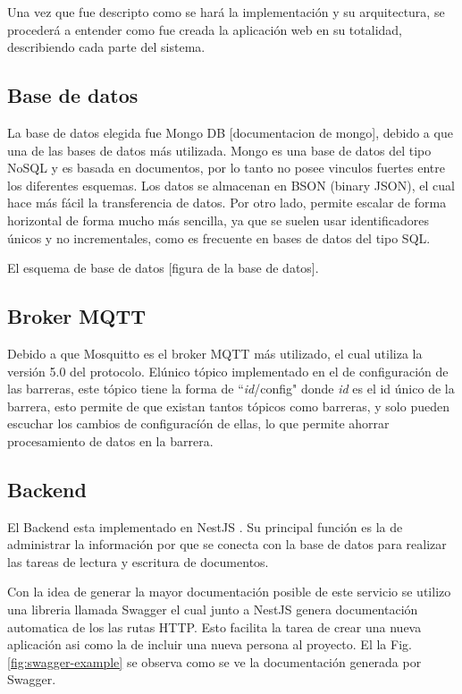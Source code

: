 Una vez que fue descripto como se hará la implementación y su arquitectura, se procederá a entender como fue creada la aplicación web en su totalidad, describiendo cada parte del sistema.

\subsection{Base de datos}

La base de datos elegida fue Mongo DB [documentacion de mongo], debido a que una de las bases de datos más utilizada. Mongo es una base de datos del tipo NoSQL y es basada en documentos, por lo tanto no posee vinculos fuertes entre los diferentes esquemas.
Los datos se almacenan en BSON (binary JSON), el cual hace más fácil la transferencia de datos. Por otro lado, permite escalar de forma horizontal de forma mucho más sencilla, ya que se suelen usar identificadores únicos y no incrementales, como es frecuente en bases de datos del tipo SQL.



El esquema de base de datos [figura de la base de datos].

\subsection{Broker MQTT}

Debido a que Mosquitto es el broker MQTT más utilizado, el cual utiliza la versión 5.0 del protocolo. Elúnico tópico implementado en el de configuración de las barreras, este tópico tiene la forma de ``\textit{id}/config" donde \textit{id} es el id único de la barrera, esto permite de que existan tantos tópicos como barreras, y solo pueden escuchar los cambios de configuracíón de ellas, lo que permite ahorrar procesamiento de datos en la barrera.

\subsection{Backend}

El Backend esta implementado en NestJS \cite{noauthor_documentacion_nodate}. Su principal función es la de administrar la información por que se conecta con la base de datos para realizar las tareas de lectura y escritura de documentos.

Con la idea de generar la mayor documentación posible de este servicio se utilizo una libreria llamada Swagger el cual junto a NestJS genera documentación automatica de los las rutas HTTP. Esto facilita la tarea de crear una nueva aplicación asi como la de incluir una nueva persona al proyecto. El la Fig. \ref{fig:swagger-example} se observa como se ve la documentación generada por Swagger.

